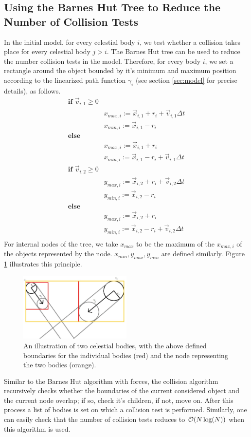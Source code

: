 \subsection{Using the Barnes Hut Tree to Reduce the Number of Collision Tests}
In the initial model, for every celestial body $i$, we test whether a collision takes place for every celestial body $j>i$. The Barnes Hut tree can be used to reduce the number collision tests in the model. Therefore, for every body $i$, we set a rectangle around the object bounded by it's minimum and maximum position according to the linearized path function $\gamma_i$ (see section \ref{sec:model} for precise details), as follows.
\[
\begin{array}{ll}
\textbf{if } \vec{v}_{i,1} \geq 0 &\\
& x_{max,i} := \vec{x}_{i,1}+r_i+\vec{v}_{i,1}\Delta t\\
& x_{min,i} := \vec{x}_{i,1}-r_i\\
\textbf{else }\\
& x_{max,i} := \vec{x}_{i,1}+r_i\\
& x_{min,i} := \vec{x}_{i,1}-r_i+\vec{v}_{i,1}\Delta t\\
\textbf{if } \vec{v}_{i,2} \geq 0 & \\
& y_{max,i} := \vec{x}_{i,2}+r_i+\vec{v}_{i,2}\Delta t\\
& y_{min,i} := \vec{x}_{i,2}-r_i\\
\textbf{else } & \\
& y_{max,i} := \vec{x}_{i,2}+r_i\\
& y_{min,i} := \vec{x}_{i,2}-r_i+\vec{v}_{i,2}\Delta t\\
\end{array}
\]
For internal nodes of the tree, we take $x_{max}$ to be the maximum of the $x_{max,i}$ of the objects represented by the node. $x_{min},y_{max},y_{min}$ are defined similarly. Figure \ref{fig:grenzen} illustrates this principle.
\begin{figure}[H]
  \centering
  \includegraphics[width=0.5\textwidth]{boundaries}
  \caption{An illustration of two celestial bodies, with the above defined boundaries for the individual bodies (red) and the node representing the two bodies (orange).}
  \label{fig:grenzen}
\end{figure}
Similar to the Barnes Hut algorithm with forces, the collision algorithm recursively checks whether the boundaries of the current considered object and the current node overlap; if so, check it's children, if not, move on. After this process a list of bodies is set on which a collision test is performed. Similarly, one can easily check that the number of collision tests reduces to $\mathcal{O}(N\log(N))$ when this algorithm is used.\\

